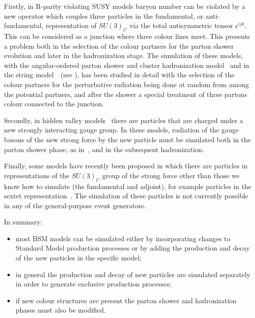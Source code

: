   Firstly, in R-parity violating SUSY models baryon number can be violated
  by a new operator which 
  couples three particles in the fundamental, or anti-fundamental, representation
  of $SU(3)_C$ via the total antisymmetric tensor $\epsilon^{ijk}$. This
  can be considered as a junction where three
  colour lines meet. This presents a problem both in the selection of 
  the colour partners for the parton shower evolution and later in the hadronization
  stage. The simulation of these models, with the angular-ordered parton
  shower and cluster hadronization model~\cite{Gibbs:1994cw,Dreiner:1999qz} and
  in the string model~\cite{Sjostrand:2002ip}~(see ),
  has been studied in detail with
  the selection of the colour partners for the perturbative radiation being done 
  at random from among the potential partners, and after the shower a 
  special treatment of three partons colour connected to the 
  junction.
  
  Secondly, in hidden valley
  models~\cite{Strassler:2006im,Strassler:2006qa} there are particles
  that are charged under a new strongly interacting gauge group.
  In these models, radiation of the gauge bosons of the new strong force
  by the new particle must be simulated both in the parton shower phase,
  as in~\cite{Carloni:2010tw}, and in the subsequent hadronization.
  
  Finally, some models have recently been proposed in which there
  are particles in representations of the $SU(3)_C$ group of the strong
  force other than those we know how to simulate (the fundamental and adjoint),
  for example particles in the sextet 
  representation~\cite{Chen:2008hh,Han:2009ya,Berger:2010fy}. The simulation
  of these particles is not currently possible in any of the general-purpose
  event generators.

  In summary:
\begin{itemize}
\item most BSM models can be simulated either by incorporating changes to 
      Standard Model production processes or by adding the production
      and decay of the new particles in the specific model;
\item in general the production and decay of new particles are simulated
      separately in order to generate exclusive production processes;
\item if new colour structures are present the parton shower and
      hadronization phases must also be modified.
\end{itemize}
 
